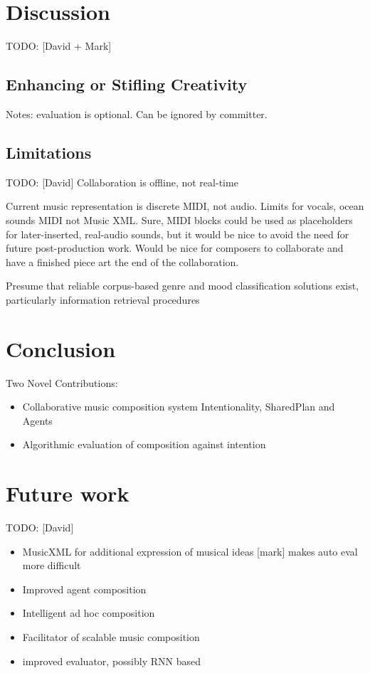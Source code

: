 \documentclass[final,authoryear,11pt,times]{elsarticle}
\begin{document}
\section{Discussion}

TODO: [David + Mark]
\subsection{Enhancing or Stifling Creativity}

Notes: evaluation is optional. Can be ignored by committer.

\subsection{Limitations}

TODO: [David]
Collaboration is offline, not real-time

Current music representation is discrete MIDI, not audio. Limits for vocals, ocean sounds
MIDI not Music XML. Sure, MIDI blocks could be used as placeholders for later-inserted, real-audio sounds, but it would be nice to avoid the need for future post-production work. Would be nice for composers to collaborate and have a finished piece art the end of the collaboration.

Presume that reliable corpus-based genre and mood classification solutions exist, particularly information retrieval procedures


\section{Conclusion}
 Two Novel Contributions:
 \begin{itemize}
\item Collaborative music composition system 
Intentionality, SharedPlan and Agents
\item Algorithmic evaluation of composition against intention
\end{itemize}

\section {Future work}
TODO: [David]

\begin{itemize}
\item MusicXML for additional expression of musical ideas [mark] makes auto eval more difficult
\item Improved agent composition
\item Intelligent ad hoc composition
\item Facilitator of scalable music composition
\item improved evaluator, possibly RNN based
\end{itemize}
\end{document}
